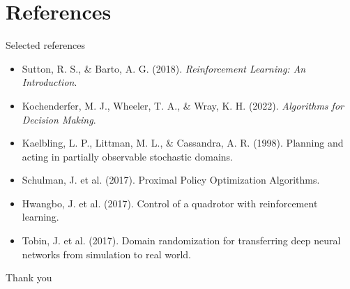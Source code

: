 \documentclass[11pt]{beamer}
\begin{document}

\section{References}


\begin{frame}{Selected references}
\footnotesize
\begin{itemize}
  \item Sutton, R. S., \& Barto, A. G. (2018). \textit{Reinforcement Learning: An Introduction}.
  \item Kochenderfer, M. J., Wheeler, T. A., \& Wray, K. H. (2022). \textit{Algorithms for Decision Making}.
  \item Kaelbling, L. P., Littman, M. L., \& Cassandra, A. R. (1998). Planning and acting in partially observable stochastic domains.
  \item Schulman, J. et al. (2017). Proximal Policy Optimization Algorithms.
  \item Hwangbo, J. et al. (2017). Control of a quadrotor with reinforcement learning.
  \item Tobin, J. et al. (2017). Domain randomization for transferring deep neural networks from simulation to real world.
\end{itemize}
\end{frame}


\begin{frame}
  \centering
  \Huge Thank you
\end{frame}
\end{document}
